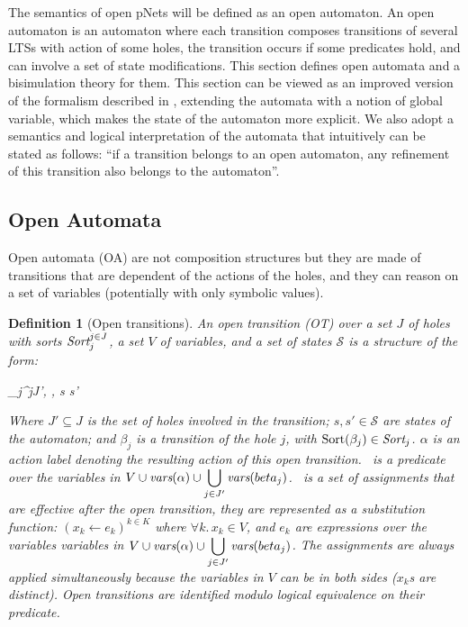 \documentclass{lmcs}
\newcommand{\TODO}[1]{\textcolor{red}{\textbf{[TODO:#1]}}}
\newtheorem{definition}{Definition}
\begin{document}
The semantics of open pNets will be defined  as an open automaton. An open
automaton is an automaton where each transition composes transitions of several LTSs with
action of some holes, the transition occurs if some predicates hold, and can involve a 
set of state modifications. This section defines open automata and a bisimulation theory for them. This section can be viewed as an improved version of the formalism described in \cite{henrio:Forte2016}, extending the automata with a notion of global variable, which makes the state of the automaton more explicit. We also adopt a semantics and logical interpretation of the automata that intuitively can be stated as follows: ``if a transition belongs to an open automaton, any refinement of this transition also belongs to the automaton''.

\subsection{Open Automata}
 Open automata (OA) are not composition structures but they are made of transitions that are dependent of the actions of the holes, and they can reason on a set of variables (potentially with only symbolic values). 
\begin{definition}[Open transitions]\label{def:OT}
	\label{def:OpenTransitions}
	An \emph{open transition} (OT) over a
	set $J$ of holes with sorts $\Sort_j^{j\in J}$, a set $V$ of variables, and a set of states $\mathcal{S}$ is 
	a structure of the form:	
	\begin{mathpar}
	\openrule
	{	\beta_j^{j\in J'}, \Pred, \Post}
	{s \OTarrow {\alpha}s'}
	\end{mathpar}
	Where $J'\subseteq J$ is the set of holes involved in the transition; $s, s'\in\mathcal{S}$ are states of the automaton; and $\beta_j$
        is a transition of the hole $j$, with $\Sortop(\beta_j)\in\Sort_j$. $\alpha$ is an action 
        label denoting the resulting action of this open transition.
        \Pred\ is a predicate over the  variables in $V\cup\vars(\alpha)\cup
			{\displaystyle \bigcup_{j\in J'}\vars(beta_j)}$. \Post\ is a set of 
	assignments that are effective after the open transition, they are
        represented as a substitution function: $({x_k\gets e_k})^{k\in K}$ 
	where $\forall k.\, x_k\in V$, and $e_k$ are expressions
        over the variables variables in $V\cup\vars(\alpha)\cup
			{\displaystyle \bigcup_{j\in J'}\vars(beta_j)}$. The assignments are always applied simultaneously because the variables in $V$ can be in both sides ($x_k$s are distinct). Open transitions are identified
        modulo logical equivalence on their predicate. 
\end{definition}
\end{document}
